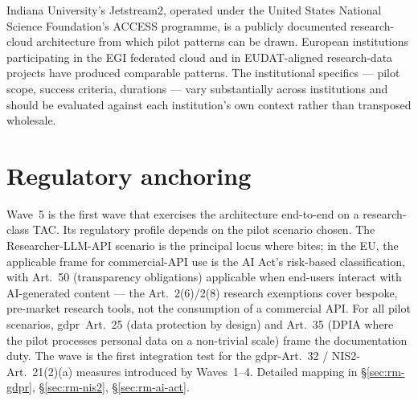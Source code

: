 \begin{realworldbox}
\noindent Indiana University's Jetstream2, operated under the
United States National Science Foundation's ACCESS programme, is
a publicly documented research-cloud architecture from which
pilot patterns can be drawn. European institutions participating
in the EGI federated cloud and in EUDAT-aligned research-data
projects have produced comparable patterns. The institutional
specifics --- pilot scope, success criteria, durations --- vary
substantially across institutions and should be evaluated against
each institution's own context rather than transposed wholesale.
\end{realworldbox}

\section{Regulatory anchoring}
\label{sec:w5-regulatory}

\noindent Wave~5 is the first wave that exercises the
architecture end-to-end on a research-class TAC. Its regulatory
profile depends on the pilot scenario chosen. The
Researcher-LLM-API scenario is the principal locus where
 bites; in the EU, the applicable frame for
commercial-API use is the AI Act's risk-based classification, with
Art.~50 (transparency obligations) applicable when end-users
interact with AI-generated content --- the Art.~2(6)/2(8) research
exemptions cover bespoke, pre-market research tools, not the
consumption of a commercial API.
For all pilot scenarios, \gls{gdpr}~Art.~25 (data protection by
design) and Art.~35 (DPIA where the pilot processes personal
data on a non-trivial scale) frame the documentation duty. The
wave is the first integration test for the
\gls{gdpr}-Art.~32 / NIS2-Art.~21(2)(a) measures introduced by
Waves~1--4. Detailed mapping in
 \S\ref{sec:rm-gdpr},
\S\ref{sec:rm-nis2}, \S\ref{sec:rm-ai-act}.
